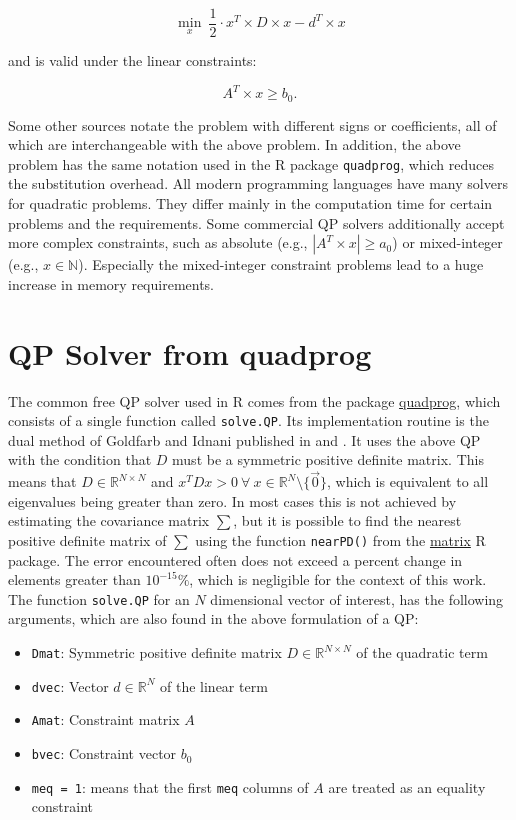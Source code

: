 \documentclass[
  oneside, a4paper, 12pt, openany]{book}
\providecommand{\tightlist}{%
  \setlength{\itemsep}{0pt}\setlength{\parskip}{0pt}}
\theoremstyle{definition}
\theoremstyle{definition}
\theoremstyle{definition}
\theoremstyle{definition}
\theoremstyle{remark}
\begin{document}
\[
  \min\limits_{x} \ \frac{1}{2} \cdot x^T \times D \times x - d^T \times x 
\]

and is valid under the linear constraints:

\[
  A^T \times x \geq b_0.
\]

Some other sources notate the problem with different signs or coefficients, all of which are interchangeable with the above problem. In addition, the above problem has the same notation used in the R package \texttt{quadprog}, which reduces the substitution overhead. All modern programming languages have many solvers for quadratic problems. They differ mainly in the computation time for certain problems and the requirements. Some commercial QP solvers additionally accept more complex constraints, such as absolute (e.g., \(|A^T \times x| \geq a_0\)) or mixed-integer (e.g., \(x \in \mathbb{N}\)). Especially the mixed-integer constraint problems lead to a huge increase in memory requirements.

\hypertarget{qp-solver-from-quadprog}{%
\section{QP Solver from quadprog}\label{qp-solver-from-quadprog}}

The common free QP solver used in R comes from the package \href{https://cran.r-project.org/web/packages/quadprog/quadprog.pdf}{quadprog}, which consists of a single function called \texttt{solve.QP}. Its implementation routine is the dual method of Goldfarb and Idnani published in \citep{GoId1982} and \citep{GoId1983}. It uses the above QP with the condition that \(D\) must be a symmetric positive definite matrix. This means that \(D\in \mathbb{R}^{N \times N}\) and \(x^T D x > 0 \ \forall \ x \in \mathbb{R}^N \setminus \{\vec{0}\}\), which is equivalent to all eigenvalues being greater than zero. In most cases this is not achieved by estimating the covariance matrix \(\sum\), but it is possible to find the nearest positive definite matrix of \(\textstyle\sum\) using the function \texttt{nearPD()} from the \href{https://cran.r-project.org/web/packages/Matrix/Matrix.pdf}{matrix} R package. The error encountered often does not exceed a percent change in elements greater than \(10^{-15} \%\), which is negligible for the context of this work. The function \texttt{solve.QP} for an \(N\) dimensional vector of interest, has the following arguments, which are also found in the above formulation of a QP:

\begin{itemize}
\tightlist
\item
  \texttt{Dmat}: Symmetric positive definite matrix \(D \in \mathbb{R}^{N \times N}\) of the quadratic term
\item
  \texttt{dvec}: Vector \(d \in \mathbb{R}^{N}\) of the linear term
\item
  \texttt{Amat}: Constraint matrix \(A\)
\item
  \texttt{bvec}: Constraint vector \(b_0\)
\item
  \texttt{meq\ =\ 1}: means that the first \texttt{meq} columns of \(A\) are treated as an equality constraint
\end{itemize}
\end{document}
